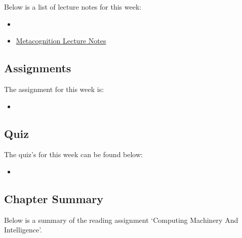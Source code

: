 \noindent Below is a list of lecture notes for this week:

\begin{itemize}
    \item {}
    \item \href{https://www.ldatschool.ca/metacognitive-strategies-or-thinking-about-my-thinking/}{Metacognition Lecture Notes}
\end{itemize}

\subsection{Assignments}

The assignment for this week is:

\begin{itemize}
    \item {}
\end{itemize}

\subsection{Quiz}

The quiz's for this week can be found below:

\begin{itemize}
    \item {}
\end{itemize}

\subsection{Chapter Summary}

Below is a summary of the reading assignment `Computing Machinery And Intelligence'.

